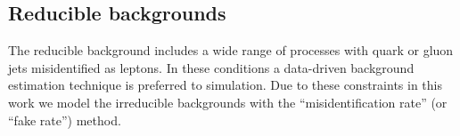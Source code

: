 


\subsection{Reducible backgrounds}

The reducible background includes a wide range of processes with quark or gluon jets misidentified as leptons. In these conditions a data-driven background estimation technique is preferred to simulation. Due to these constraints in this work we model the irreducible backgrounds with the ``misidentification rate'' (or ``fake rate'') method.

